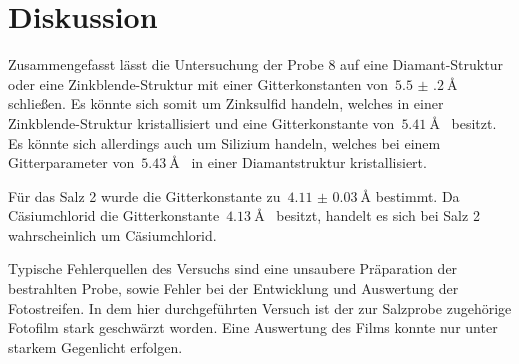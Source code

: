 \section{Diskussion}
\label{sec:diskussion}

Zusammengefasst lässt die Untersuchung der Probe 8 auf eine Diamant-Struktur oder eine Zinkblende-Struktur
mit einer Gitterkonstanten von~$\SI{5.5(2)}{\angstrom}$ schließen. Es könnte
sich somit um Zinksulfid handeln, welches in einer Zinkblende-Struktur
kristallisiert und eine Gitterkonstante von~$\SI{5.41}{\angstrom}$~\cite{zinksulfid} besitzt.
Es könnte sich allerdings auch um Silizium handeln, welches bei einem Gitterparameter
von~$\SI{5.43}{\angstrom}$~\cite{zinksulfid} in einer Diamantstruktur kristallisiert.

Für das Salz 2 wurde die Gitterkonstante zu~$\SI{4.11(3)}{\angstrom}$ bestimmt. Da Cäsiumchlorid die
Gitterkonstante~$\SI{4.13}{\angstrom}$~\cite{cäsiumchlorid} besitzt, handelt es sich bei Salz 2
wahrscheinlich um Cäsiumchlorid.

Typische Fehlerquellen des Versuchs sind eine unsaubere Präparation der
bestrahlten Probe, sowie Fehler bei der Entwicklung und Auswertung der
Fotostreifen. In dem hier durchgeführten Versuch ist der zur Salzprobe
zugehörige Fotofilm stark geschwärzt worden. Eine Auswertung des Films konnte
nur unter starkem Gegenlicht erfolgen.
